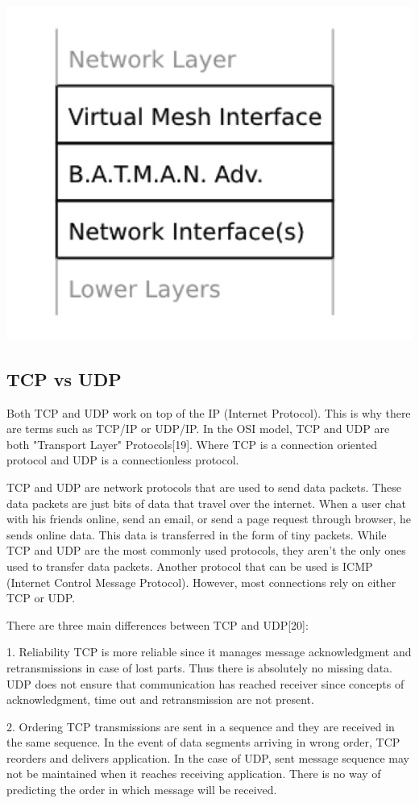 \documentclass{mproj}
\begin{document}
\includegraphics[width = .7\textwidth]{c.jpg}

\subsection{TCP vs UDP}
Both TCP and UDP work on top of the IP (Internet Protocol). This is why there are terms such as TCP/IP or UDP/IP. In the OSI model, TCP and UDP are both "Transport Layer" Protocols[19]. Where TCP is a connection oriented protocol and UDP is a connectionless protocol.  

TCP and UDP are network protocols that are used to send data packets. These data packets are just bits of data that travel over the internet. When a user chat with his friends online, send an email, or send a page request through browser, he sends online data. This data is transferred in the form of tiny packets. While TCP and UDP are the most commonly used protocols, they aren’t the only ones used to transfer data packets. Another protocol that can be used is ICMP (Internet Control Message Protocol). However, most connections rely on either TCP or UDP.

There are three main differences between TCP and UDP[20]:

1. Reliability
TCP is more reliable since it manages message acknowledgment and retransmissions in case of lost parts. Thus there is absolutely no missing data. UDP does not ensure that communication has reached receiver since concepts of acknowledgment, time out and retransmission are not present.

2. Ordering
TCP transmissions are sent in a sequence and they are received in the same sequence. In the event of data segments arriving in wrong order, TCP reorders and delivers application. In the case of UDP, sent message sequence may not be maintained when it reaches receiving application. There is no way of predicting the order in which message will be received.
\end{document}
